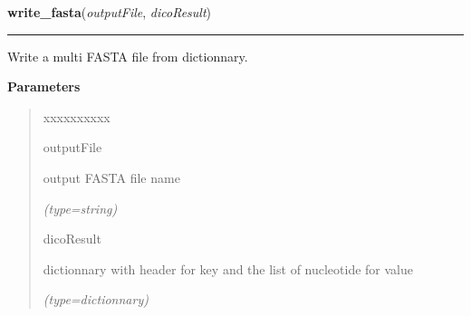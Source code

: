     \label{script-VCFtoPseudoGenome:write_fasta}

    \vspace{0.5ex}

\hspace{.8\funcindent}\begin{boxedminipage}{\funcwidth}

    \raggedright \textbf{write\_fasta}(\textit{outputFile}, \textit{dicoResult})

    \vspace{-1.5ex}

    \rule{\textwidth}{0.5\fboxrule}
\setlength{\parskip}{2ex}
    Write a multi FASTA file from dictionnary.

\setlength{\parskip}{1ex}
      \textbf{Parameters}
      \vspace{-1ex}

      \begin{quote}
        \begin{Ventry}{xxxxxxxxxx}

          \item[outputFile]

          output FASTA file name

            {\it (type=string)}

          \item[dicoResult]

          dictionnary with header for key and the list of nucleotide for 
          value

            {\it (type=dictionnary)}

        \end{Ventry}

      \end{quote}

    \end{boxedminipage}

    \label{script-VCFtoPseudoGenome:fasta_to_dico}

    \vspace{0.5ex}

